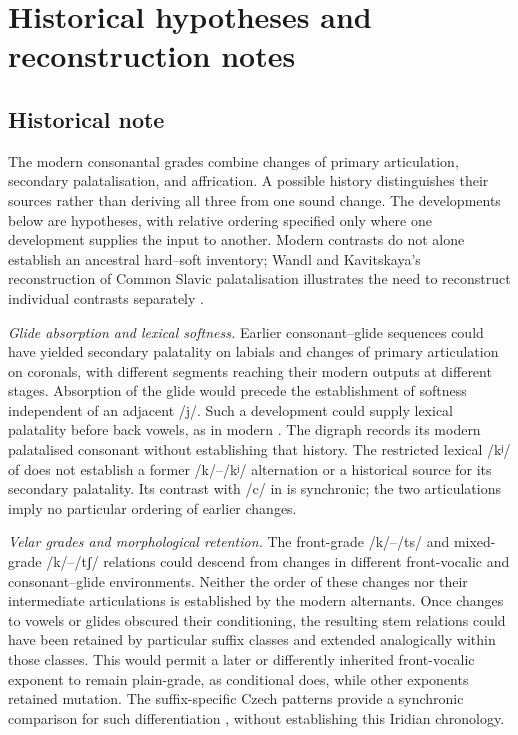 \chapter{Historical hypotheses and reconstruction notes}\label{app:history}

\section{Historical note}\label{sec:historical-note}

The modern consonantal grades combine changes of primary articulation,
secondary palatalisation, and affrication. A possible history distinguishes
their sources rather than deriving all three from one sound change.
The developments below are hypotheses, with relative ordering specified
only where one development supplies the input to another. Modern contrasts
do not alone establish an ancestral hard--soft inventory; Wandl and
Kavitskaya's reconstruction of Common Slavic palatalisation illustrates the
need to reconstruct individual contrasts separately \cite{wandlkavitskaya2023}.

\noindent\textit{Glide absorption and lexical softness.}\quad
Earlier consonant--glide sequences could have yielded secondary palatality
on labials and changes of primary articulation on coronals, with different
segments reaching their modern outputs at different stages. Absorption of
the glide would precede the establishment of softness independent of an
adjacent /j/. Such a development could supply lexical palatality before
back vowels, as in modern . The digraph 
records its modern palatalised consonant without establishing that history.
The restricted lexical /kʲ/ of  does not establish a former
/k/--/kʲ/ alternation or a historical source for its secondary palatality.
Its contrast with /c/ in  is synchronic; the two articulations
imply no particular ordering of earlier changes.

\noindent\textit{Velar grades and morphological retention.}\quad
The front-grade /k/--/ts/ and mixed-grade /k/--/tʃ/ relations could descend
from changes in different front-vocalic and consonant--glide environments.
Neither the order of these changes nor their intermediate articulations
is established by the modern alternants. Once changes to vowels or glides
obscured their conditioning, the resulting stem relations could have been
retained by particular suffix classes and extended analogically within
those classes. This would permit a later or differently inherited
front-vocalic exponent to remain plain-grade, as conditional 
does, while other exponents retained mutation. The suffix-specific Czech
patterns provide a synchronic comparison for such differentiation
\cite{caviranivandenwyngaerd2026}, without establishing this Iridian chronology.


